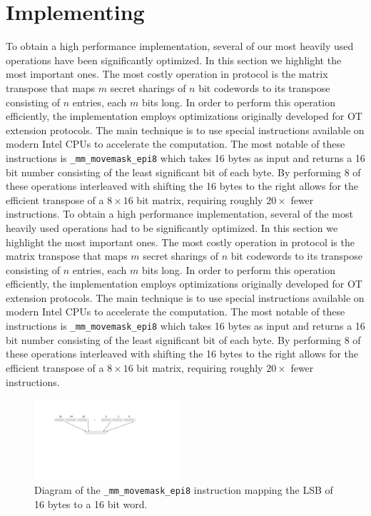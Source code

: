 
\section{Implementing}

To obtain a high performance implementation, several of our most heavily used operations have been significantly optimized. In this section we highlight the most important ones. The most costly operation in \cite{DBLP:conf/tcc/FrederiksenJNT16} protocol is the matrix transpose that maps $m$ secret sharings of $n$ bit codewords to its transpose consisting of $n$ entries, each $m$ bits long. In order to perform this operation efficiently, the implementation employs optimizations originally developed for OT extension protocols. The main technique is to use special instructions available on modern Intel CPUs to accelerate the computation. The most notable of these instructions is \texttt{\_mm\_movemask\_epi8} which takes 16 bytes as input and returns a 16 bit number consisting of the least significant bit of each byte. By performing 8 of these operations interleaved with shifting the 16 bytes to the right allows for the efficient transpose of a $8\times 16$ bit matrix, requiring roughly $20\times$ fewer instructions.
To obtain a high performance implementation, several of the most heavily used operations had to be significantly optimized. In this section we highlight the most important ones. The most costly operation in \cite{DBLP:conf/tcc/FrederiksenJNT16} protocol is the matrix transpose that maps $m$ secret sharings of $n$ bit codewords to its transpose consisting of $n$ entries, each $m$ bits long. In order to perform this operation efficiently, the implementation employs optimizations originally developed for OT extension protocols. The main technique is to use special instructions available on modern Intel CPUs to accelerate the computation. The most notable of these instructions is \texttt{\_mm\_movemask\_epi8} which takes 16 bytes as input and returns a 16 bit number consisting of the least significant bit of each byte. By performing 8 of these operations interleaved with shifting the 16 bytes to the right allows for the efficient transpose of a $8\times 16$ bit matrix, requiring roughly $20\times$ fewer instructions. 
\begin{figure}[h]
	\centering
\includegraphics[height=3cm,trim={2cm 10.5cm 7cm 3cm},clip]{dgrm}
\caption{Diagram of the \texttt{\_mm\_movemask\_epi8} instruction mapping the LSB of 16 bytes to a 16 bit word.}
\end{figure}
